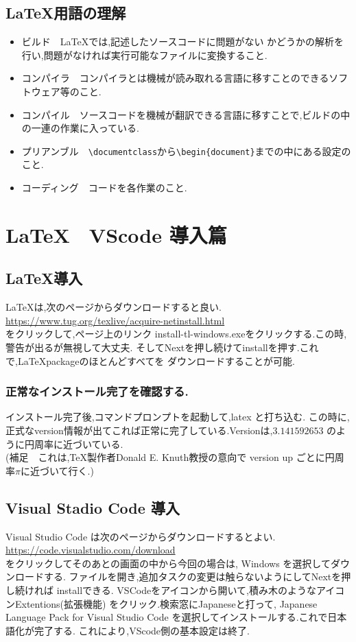 \documentclass{ltjsarticle}
\begin{document}
\subsection{\LaTeX 用語の理解}
\begin{itemize}
  \item ビルド　\LaTeX では,記述したソースコードに問題がない
        かどうかの解析を行い,問題がなければ実行可能なファイルに変換すること.
  \item コンパイラ　コンパイラとは機械が読み取れる言語に移すことのできるソフトウェア等のこと.
  \item コンパイル　ソースコードを機械が翻訳できる言語に移すことで,ビルドの中の一連の作業に入っている.
  \item プリアンブル　\verb|\documentclass|から\verb|\begin{document}|までの中にある設定のこと.
  \item コーディング　コードを各作業のこと.
\end{itemize}


\section{\LaTeX　VScode 導入篇}

\subsection{\LaTeX 導入}
\LaTeX は,次のページからダウンロードすると良い.\\
\url{https://www.tug.org/texlive/acquire-netinstall.html}\\
をクリックして,ページ上のリンク install-tl-windows.exeをクリックする.この時,
警告が出るが無視して大丈夫.
そしてNextを押し続けてinstallを押す.これで,\LaTeX packageのほとんどすべてを
ダウンロードすることが可能.
\subsubsection*{正常なインストール完了を確認する.}
インストール完了後,コマンドプロンプトを起動して,latex と打ち込む.
この時に,正式なversion情報が出てこれば正常に完了している.Versionは,$3.141592653$
のように円周率に近づいている.\\
(補足　これは,\TeX 製作者Donald E. Knuth教授の意向で
version up ごとに円周率$\pi$に近づいて行く.)
\subsection{Visual Stadio Code 導入}
Visual Studio Code は次のページからダウンロードするとよい.\\
\url{https://code.visualstudio.com/download}\\
をクリックしてそのあとの画面の中から今回の場合は,
Windows を選択してダウンロードする.
ファイルを開き,追加タスクの変更は触らないようにしてNextを押し続ければ
installできる.
VSCodeをアイコンから開いて,積み木のようなアイコンExtentions(拡張機能)
をクリック.検索窓にJapaneseと打って,
Japanese Language Pack for Visual Studio Code
を選択してインストールする.これで日本語化が完了する.
これにより,VScode側の基本設定は終了.
\end{document}
